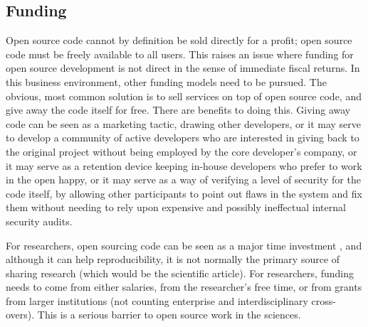 

\subsection{Funding}
\label{subsec:oss-funding}

Open source code cannot by definition be sold directly for a profit; open source code must be freely available to all users. This raises an issue where funding for open source development is not direct in the sense of immediate fiscal returns. In this business environment, other funding models need to be pursued. The obvious, most common solution is to sell services on top of open source code, and give away the code itself for free. There are benefits to doing this. Giving away code can be seen as a marketing tactic, drawing other developers, or it may serve to develop a community of active developers who are interested in giving back to the original project without being employed by the core developer's company, or it may serve as a retention device keeping in-house developers who prefer to work in the open happy, or it may serve as a way of verifying a level of security for the code itself, by allowing other participants to point out flaws in the system and fix them without needing to rely upon expensive and possibly ineffectual internal security audits.

For researchers, open sourcing code can be seen as a major time investment \citep{fitzjohn2014reproducible, lowndes2017our}, and although it can help reproducibility, it is not normally the primary source of sharing research (which would be the scientific article). For researchers, funding needs to come from either salaries, from the researcher's free time, or from grants from larger institutions (not counting enterprise and interdisciplinary cross-overs). This is a serious barrier to open source work in the sciences.

